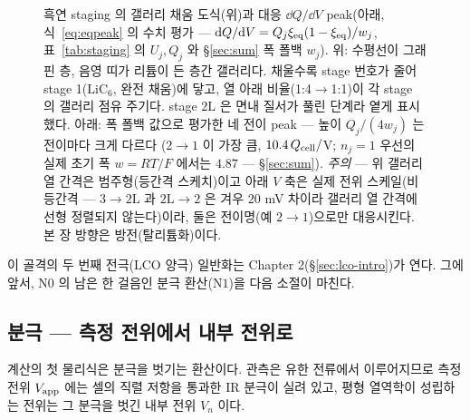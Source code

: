 \begin{figure}[t]
\caption{흑연 staging 의 갤러리 채움 도식(위)과 대응 $\dd Q/\dd V$ peak(아래, 식~\eqref{eq:eqpeak} 의
수치 평가 --- $\mathrm{d} Q/\mathrm{d} V=Q_j\xi_{\mathrm{eq}}(1-\xi_{\mathrm{eq}})/w_j$, 표~\ref{tab:staging} 의 $U_j,Q_j$ 와 \S\ref{sec:sum} 폭 폴백 $w_j$).
위: 수평선이 그래핀 층, 음영 띠가 리튬이 든 층간 갤러리다. 채울수록 stage 번호가 줄어 stage 1($\mathrm{LiC_6}$,
완전 채움)에 닿고, 열 아래 비율(1:4$\to$1:1)이 각 stage 의 갤러리 점유 주기다. stage $2\mathrm L$ 은 면내 질서가
풀린 단계라 옅게 표시했다. 아래: 폭 폴백 값으로 평가한 네 전이 peak --- 높이 $Q_j/(4w_j)$ 는 전이마다 크게 다르다
($2\to1$ 이 가장 큼, $10.4\,Q_{\mathrm{cell}}/$V; $n_j{=}1$ 우선의 실제 초기 폭 $w{=}RT/F$ 에서는 $4.87$ --- \S\ref{sec:sum}). \emph{주의} --- 위 갤러리 열 간격은 범주형(등간격 스케치)이고 아래 $V$
축은 실제 전위 스케일(비등간격 --- $3\to2\mathrm L$ 과 $2\mathrm L\to2$ 은 겨우 $20$ mV 차이라 갤러리 열 간격에
선형 정렬되지 않는다)이라, 둘은 전이명(예 $2\to1$)으로만 대응시킨다. 본 장 방향은 방전(탈리튬화)이다.}
\label{fig:staging}
\end{figure}

이 골격의 두 번째 전극(LCO 양극) 일반화는 Chapter 2(\S\ref{sec:lco-intro})가 연다. 그에 앞서, $\mathrm N0$ 의
남은 한 걸음인 분극 환산($\mathrm N1$)을 다음 소절이 마친다.

\subsection{분극 --- 측정 전위에서 내부 전위로}\label{sec:pol}
계산의 첫 물리식은 분극을 벗기는 환산이다. 관측은 유한 전류에서 이루어지므로 측정 전위 $V_{\mathrm{app}}$ 에는 셀의
직렬 저항을 통과한 IR 분극이 실려 있고, 평형 열역학이 성립하는 전위는 그 분극을 벗긴 내부 전위 $V_n$ 이다.

